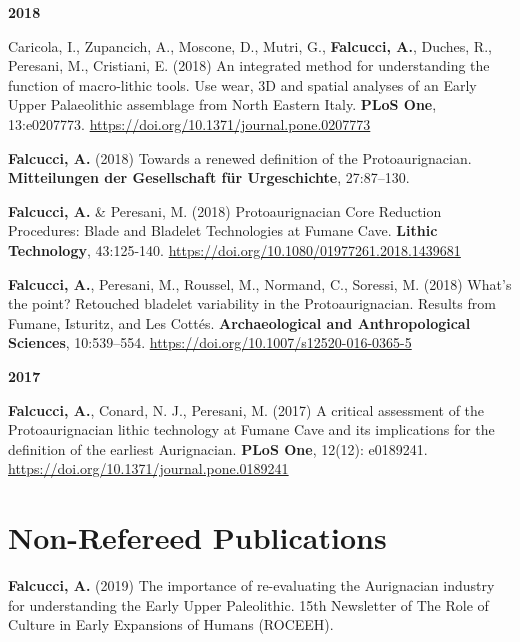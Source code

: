 \documentclass[11pt,a4paper,]{awesome-cv}
\begin{document}
\setlength{\leftskip}{0cm}

\textbf{2018}

\setlength{\leftskip}{1cm}

Caricola, I., Zupancich, A., Moscone, D., Mutri, G., \textbf{Falcucci,
A.}, Duches, R., Peresani, M., Cristiani, E. (2018) An integrated method
for understanding the function of macro-lithic tools. Use wear, 3D and
spatial analyses of an Early Upper Palaeolithic assemblage from North
Eastern Italy. \textbf{PLoS One}, 13:e0207773.
\url{https://doi.org/10.1371/journal.pone.0207773}

\textbf{Falcucci, A.} (2018) Towards a renewed definition of the
Protoaurignacian. \textbf{Mitteilungen der Gesellschaft für
Urgeschichte}, 27:87--130.

\textbf{Falcucci, A.} \& Peresani, M. (2018) Protoaurignacian Core
Reduction Procedures: Blade and Bladelet Technologies at Fumane Cave.
\textbf{Lithic Technology}, 43:125-140.
\url{https://doi.org/10.1080/01977261.2018.1439681}

\textbf{Falcucci, A.}, Peresani, M., Roussel, M., Normand, C., Soressi,
M. (2018) What's the point? Retouched bladelet variability in the
Protoaurignacian. Results from Fumane, Isturitz, and Les Cottés.
\textbf{Archaeological and Anthropological Sciences}, 10:539--554.
\url{https://doi.org/10.1007/s12520-016-0365-5}

\setlength{\leftskip}{0cm}

\textbf{2017}

\setlength{\leftskip}{1cm}

\textbf{Falcucci, A.}, Conard, N. J., Peresani, M. (2017) A critical
assessment of the Protoaurignacian lithic technology at Fumane Cave and
its implications for the definition of the earliest Aurignacian.
\textbf{PLoS One}, 12(12): e0189241.
\url{https://doi.org/10.1371/journal.pone.0189241}

\setlength{\leftskip}{0cm}

\hypertarget{non-refereed-publications}{%
\section{Non-Refereed Publications}\label{non-refereed-publications}}

\textbf{Falcucci, A.} (2019) The importance of re-evaluating the
Aurignacian industry for understanding the Early Upper Paleolithic. 15th
Newsletter of The Role of Culture in Early Expansions of Humans
(ROCEEH).

\setlength{\leftskip}{0cm}
\end{document}

